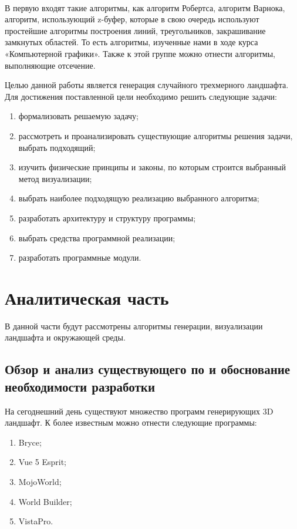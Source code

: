 \documentclass[a4paper, 10pt]{article}
\begin{document}
	\\ \hspace*{5mm}В первую входят такие алгоритмы, как алгоритм Робертса, алгоритм Варнока, алгоритм, использующий z-буфер, которые в свою очередь используют простейшие алгоритмы построения линий, треугольников, закрашивание замкнутых областей. То есть алгоритмы, изученные нами в ходе курса «Компьютерной графики». Также к этой группе можно отнести алгоритмы, выполняющие отсечение.
	 
	Целью данной работы является генерация случайного трехмерного ландшафта. 
	\\Для достижения поставленной цели необходимо решить следующие задачи:
	\begin{enumerate}
		\item формализовать решаемую задачу;
		\item рассмотреть и проанализировать существующие алгоритмы решения задачи, выбрать подходящий;
		\item изучить физические принципы и законы, по которым строится выбранный метод визуализации;
		\item выбрать наиболее подходящую реализацию выбранного алгоритма;
		\item разработать архитектуру и структуру программы;
		\item выбрать средства программной реализации;
		\item разработать программные модули.
	\end{enumerate}
	
\clearpage
\newpage
\section{Аналитическая часть}
	\hspace*{5mm} В данной части будут рассмотрены алгоритмы генерации, визуализации ландшафта и окружающей среды. 
	\subsection{Обзор и анализ существующего по и обоснование необходимости разработки}
	\hspace*{5mm} На сегоднешний день существуют множество программ генерирующих 3D ландшафт.\cite{po} К более известным можно отнести следующие программы:
	\begin{enumerate}
		\item Bryce;
		\item Vue 5 Esprit;
		\item MojoWorld;
		\item World Builder;
		\item VistaPro.
	\end{enumerate}
\end{document}
